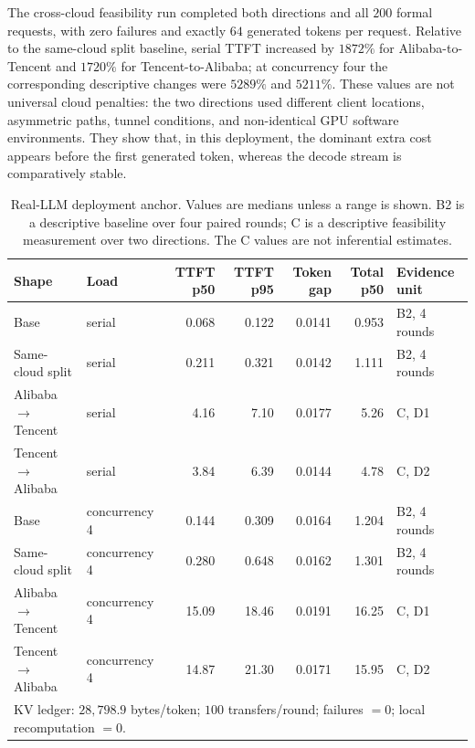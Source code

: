 The cross-cloud feasibility run completed both directions and all $200$ formal requests, with
zero failures and exactly $64$ generated tokens per request. Relative to the same-cloud split
baseline, serial TTFT increased by $1872\%$ for Alibaba-to-Tencent and $1720\%$ for
Tencent-to-Alibaba; at concurrency four the corresponding descriptive changes were $5289\%$
and $5211\%$. These values are not universal cloud penalties: the two directions used different
client locations, asymmetric paths, tunnel conditions, and non-identical GPU software
environments. They show that, in this deployment, the dominant extra cost appears before the
first generated token, whereas the decode stream is comparatively stable.

\begin{table}[t]
\centering
\caption{Real-LLM deployment anchor. Values are medians unless a range is shown. B2 is a
descriptive baseline over four paired rounds; C is a descriptive feasibility measurement over two
directions. The C values are not inferential estimates.}
\label{tab:cloudcost}
\scriptsize
\setlength{\tabcolsep}{3pt}
\begin{tabular}{@{}llrrrrl@{}}
\toprule
Shape & Load & TTFT p50 & TTFT p95 & Token gap & Total p50 & Evidence unit \\
\midrule
Base & serial & 0.068 & 0.122 & 0.0141 & 0.953 & B2, 4 rounds \\
Same-cloud split & serial & 0.211 & 0.321 & 0.0142 & 1.111 & B2, 4 rounds \\
Alibaba $\rightarrow$ Tencent & serial & 4.16 & 7.10 & 0.0177 & 5.26 & C, D1 \\
Tencent $\rightarrow$ Alibaba & serial & 3.84 & 6.39 & 0.0144 & 4.78 & C, D2 \\
\midrule
Base & concurrency 4 & 0.144 & 0.309 & 0.0164 & 1.204 & B2, 4 rounds \\
Same-cloud split & concurrency 4 & 0.280 & 0.648 & 0.0162 & 1.301 & B2, 4 rounds \\
Alibaba $\rightarrow$ Tencent & concurrency 4 & 15.09 & 18.46 & 0.0191 & 16.25 & C, D1 \\
Tencent $\rightarrow$ Alibaba & concurrency 4 & 14.87 & 21.30 & 0.0171 & 15.95 & C, D2 \\
\midrule
\multicolumn{7}{l}{KV ledger: $28{,}798.9$ bytes/token; $100$ transfers/round; failures $=0$; local recomputation $=0$.}\\
\bottomrule
\end{tabular}
\end{table}

